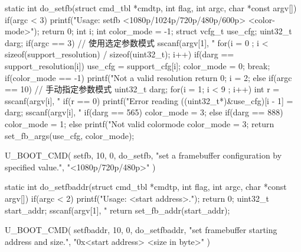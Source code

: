 \begin{CodeBlock}[language=BookC]
static int do_setfb(struct cmd_tbl *cmdtp, int flag, int argc, char *const argv[]) {
    if(argc < 3) {
		printf("Usage: setfb <1080p/1024p/720p/480p/600p> <color-mode>\n");
		return 0;
    }
    int i;
    int color_mode = -1;
    struct vcfg_t use_cfg;
    uint32_t darg;
    if(argc == 3) {
        // 使用选定参数模式
	    sscanf(argv[1], "%
        for(i = 0 ; i < sizeof(support_resolution) / sizeof(uint32_t); i++) {
            if(darg == support_resolution[i]) {
                use_cfg = support_cfg[i];
                color_mode = 0;
                break;
            }
        }
        if(color_mode == -1) {
            printf("Not a valid resolution %
            return 0;
        }
        i = 2;
    } else if(argc == 10){
        // 手动指定参数模式
        uint32_t darg;
        for(i = 1; i < 9 ; i++) {
            int r = sscanf(argv[i], "%
            if(r == 0) {
                printf("Error reading %
            }
            ((uint32_t*)&use_cfg)[i - 1] = darg;
        }
    }
    sscanf(argv[i], "%
    if(darg == 565) {
        color_mode = 3;
    } else if(darg == 888) {
        color_mode = 1;
    } else {
        printf("Not valid colormode %
        color_mode = 3;
    }
    return set_fb_args(use_cfg, color_mode);
}

U_BOOT_CMD(
    setfb, 10, 0,  do_setfb,
    "set a framebuffer configuration by specified value.\n",
    "<1080p/720p/480p>"
)

static int do_setfbaddr(struct cmd_tbl *cmdtp, int flag, int argc, char *const argv[]) {
    if(argc < 2) {
        printf("Usage: <start address>.\n");
        return 0;
    }
    uint32_t start_addr;
    sscanf(argv[1], "%
    return set_fb_addr(start_addr);
}

U_BOOT_CMD(
    setfbaddr, 10, 0,  do_setfbaddr,
    "set framebuffer starting address and size.\n",
    "0x<start address> <size in byte>"
)
\end{CodeBlock}
